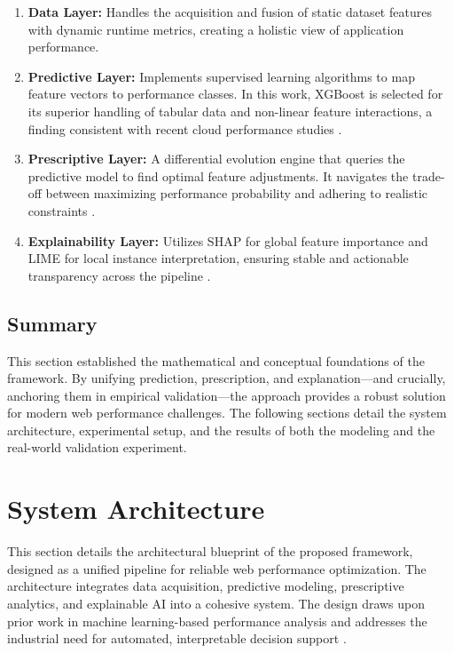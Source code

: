 \documentclass[sn-nature]{sn-jnl}
\begin{document}
\begin{enumerate}
    \item \textbf{Data Layer:} Handles the acquisition and fusion of static dataset features with dynamic runtime metrics, creating a holistic view of application performance.
    \item \textbf{Predictive Layer:} Implements supervised learning algorithms to map feature vectors to performance classes. In this work, XGBoost is selected for its superior handling of tabular data and non-linear feature interactions, a finding consistent with recent cloud performance studies \cite{xin2023, huang2023}.
    \item \textbf{Prescriptive Layer:} A differential evolution engine that queries the predictive model to find optimal feature adjustments. It navigates the trade-off between maximizing performance probability and adhering to realistic constraints \cite{asha2025}.
    \item \textbf{Explainability Layer:} Utilizes SHAP for global feature importance and LIME for local instance interpretation, ensuring stable and actionable transparency across the pipeline \cite{goldwasser2024}.
\end{enumerate}

\subsection{Summary}

This section established the mathematical and conceptual foundations of the framework. By unifying prediction, prescription, and explanation—and crucially, anchoring them in empirical validation—the approach provides a robust solution for modern web performance challenges. The following sections detail the system architecture, experimental setup, and the results of both the modeling and the real-world validation experiment.


\section{System Architecture}\label{sec4}

This section details the architectural blueprint of the proposed framework, designed as a unified pipeline for reliable web performance optimization. The architecture integrates data acquisition, predictive modeling, prescriptive analytics, and explainable AI into a cohesive system. The design draws upon prior work in machine learning-based performance analysis \cite{ghattas2025, mathur2024} and addresses the industrial need for automated, interpretable decision support \cite{vanriet2023, notz2024}.
\end{document}
